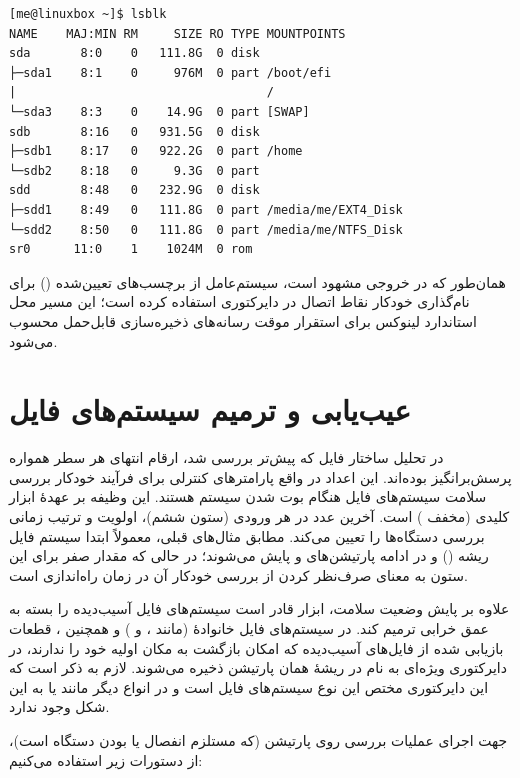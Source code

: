 \begin{latin}
\begin{lstlisting}
[me@linuxbox ~]$ lsblk
NAME    MAJ:MIN RM     SIZE RO TYPE MOUNTPOINTS
sda       8:0    0   111.8G  0 disk
├─sda1    8:1    0     976M  0 part /boot/efi
|                                   /
└─sda3    8:3    0    14.9G  0 part [SWAP]
sdb       8:16   0   931.5G  0 disk
├─sdb1    8:17   0   922.2G  0 part /home
└─sdb2    8:18   0     9.3G  0 part
sdd       8:48   0   232.9G  0 disk
├─sdd1    8:49   0   111.8G  0 part /media/me/EXT4_Disk
└─sdd2    8:50   0   111.8G  0 part /media/me/NTFS_Disk
sr0      11:0    1    1024M  0 rom
\end{lstlisting}
\end{latin}

همان‌طور که در خروجی مشهود است، سیستم‌عامل از برچسب‌های تعیین‌شده () برای نام‌گذاری خودکار نقاط اتصال در دایرکتوری  استفاده کرده است؛ این مسیر محل استاندارد لینوکس برای استقرار موقت رسانه‌های ذخیره‌سازی قابل‌حمل محسوب می‌شود.

\section{عیب‌یابی و ترمیم سیستم‌های فایل}

در تحلیل ساختار فایل  که پیش‌تر بررسی شد، ارقام انتهای هر سطر همواره پرسش‌برانگیز بوده‌اند. این اعداد در واقع پارامترهای کنترلی برای فرآیند خودکار بررسی سلامت سیستم‌های فایل هنگام بوت شدن سیستم هستند. این وظیفه بر عهدهٔ ابزار کلیدی  (مخفف ) است. آخرین عدد در هر ورودی  (ستون ششم)، اولویت و ترتیب زمانی بررسی دستگاه‌ها را تعیین می‌کند. مطابق مثال‌های قبلی، معمولاً ابتدا سیستم فایل ریشه (\cmd{/}) و در ادامه پارتیشن‌های  و  پایش می‌شوند؛ در حالی که مقدار صفر برای این ستون به معنای صرف‌نظر کردن از بررسی خودکار آن در زمان راه‌اندازی است.

علاوه بر پایش وضعیت سلامت، ابزار  قادر است سیستم‌های فایل آسیب‌دیده را بسته به عمق خرابی ترمیم کند. در سیستم‌های فایل خانوادهٔ  (مانند ،  و ) و همچنین ، قطعات بازیابی شده از فایل‌های آسیب‌دیده که امکان بازگشت به مکان اولیه خود را ندارند، در دایرکتوری ویژه‌ای به نام  در ریشهٔ همان پارتیشن ذخیره می‌شوند. لازم به ذکر است که این دایرکتوری مختص این نوع سیستم‌های فایل است و در انواع دیگر مانند  یا  به این شکل وجود ندارد.

جهت اجرای عملیات بررسی روی پارتیشن  (که مستلزم انفصال یا  بودن دستگاه است)، از دستورات زیر استفاده می‌کنیم:


